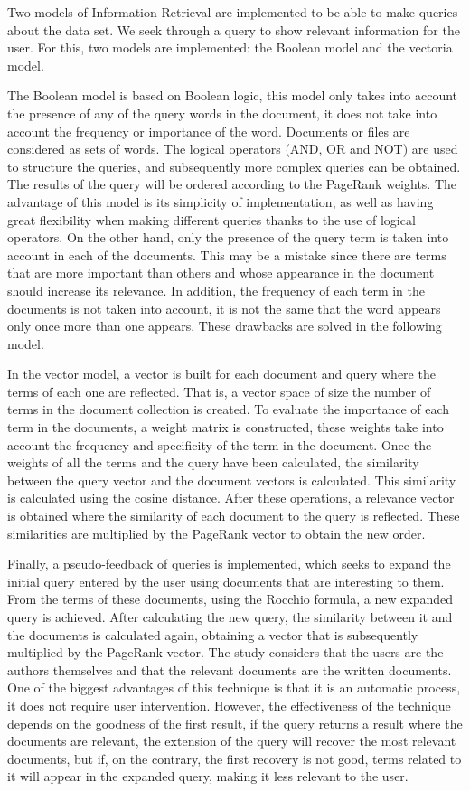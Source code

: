 \documentclass[size=a4, parskip=half, titlepage=false, toc=flat, toc=bib, 12pt, twoside]{scrartcl}
\theoremstyle{theorem-style}
\theoremstyle{definition-style}
\theoremstyle{remark-style}
\theoremstyle{example-style}
\theoremstyle{definition-style}
\theoremstyle{remark-style}
\begin{document}
Two models of Information Retrieval are implemented to be able to make queries about the data set. We seek through a query to show relevant information for the user. For this, two models are implemented: the Boolean model and the vectoria model.

The Boolean model is based on Boolean logic, this model only takes into account the presence of any of the query words in the document, it does not take into account the frequency or importance of the word. Documents or files are considered as sets of words. The logical operators (AND, OR and NOT) are used to structure the queries, and subsequently more complex queries can be obtained. The results of the query will be ordered according to the PageRank weights. The advantage of this model is its simplicity of implementation, as well as having great flexibility when making different queries thanks to the use of logical operators. On the other hand, only the presence of the query term is taken into account in each of the documents. This may be a mistake since there are terms that are more important than others and whose appearance in the document should increase its relevance. In addition, the frequency of each term in the documents is not taken into account, it is not the same that the word appears only once more than one appears. These drawbacks are solved in the following model.

In the vector model, a vector is built for each document and query where the terms of each one are reflected. That is, a vector space of size the number of terms in the document collection is created. To evaluate the importance of each term in the documents, a weight matrix is constructed, these weights take into account the frequency and specificity of the term in the document. Once the weights of all the terms and the query have been calculated, the similarity between the query vector and the document vectors is calculated. This similarity is calculated using the cosine distance. After these operations, a relevance vector is obtained where the similarity of each document to the query is reflected. These similarities are multiplied by the PageRank vector to obtain the new order.

Finally, a pseudo-feedback of queries is implemented, which seeks to expand the initial query entered by the user using documents that are interesting to them. From the terms of these documents, using the Rocchio formula, a new expanded query is achieved. After calculating the new query, the similarity between it and the documents is calculated again, obtaining a vector that is subsequently multiplied by the PageRank vector. The study considers that the users are the authors themselves and that the relevant documents are the written documents. One of the biggest advantages of this technique is that it is an automatic process, it does not require user intervention. However, the effectiveness of the technique depends on the goodness of the first result, if the query returns a result where the documents are relevant, the extension of the query will recover the most relevant documents, but if, on the contrary, the first recovery is not good, terms related to it will appear in the expanded query, making it less relevant to the user.
\end{document}
